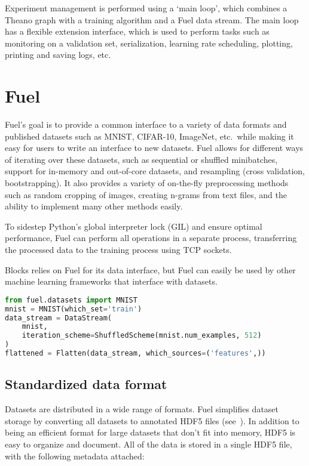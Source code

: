 \documentclass[twoside,11pt]{article}
\begin{document}
Experiment management is performed using a `main loop', which combines a Theano
graph with a training algorithm and a Fuel data stream. The main loop has a
flexible extension interface, which is used to perform tasks such as monitoring
on a validation set, serialization, learning rate scheduling, plotting, printing
and saving logs, etc.

\section{Fuel}

Fuel's goal is to provide a common interface to a variety of data formats and
published datasets such as MNIST, CIFAR-10, ImageNet, etc.\ while making it easy
for users to write an interface to new datasets. Fuel allows for different ways
of iterating over these datasets, such as sequential or shuffled minibatches,
support for in-memory and out-of-core datasets, and resampling (cross
validation, bootstrapping). It also provides a variety of on-the-fly
preprocessing methods such as random cropping of images, creating n-grams from
text files, and the ability to implement many other methods easily.

To sidestep Python's global interpreter lock (GIL) and ensure optimal
performance, Fuel can perform all operations in a separate process,
transferring the processed data to the training process using TCP sockets.

Blocks relies on Fuel for its data interface, but Fuel can easily be used by
other machine learning frameworks that interface with datasets.

\begin{lstlisting}[language=Python,basicstyle=\ttfamily,caption=Iterating over flattened MNIST features in shuffled batches]
from fuel.datasets import MNIST
mnist = MNIST(which_set='train')
data_stream = DataStream(
    mnist,
    iteration_scheme=ShuffledScheme(mnist.num_examples, 512)
)
flattened = Flatten(data_stream, which_sources=('features',))
\end{lstlisting}

\subsection{Standardized data format}

Datasets are distributed in a wide range of formats. Fuel simplifies dataset
storage by converting all datasets to annotated HDF5 
files (see~\cite{hdf5}). In addition to being
an efficient format for large datasets that don't fit into memory, HDF5 is easy
to organize and document. All of the data is stored in a single HDF5 file, with
the following metadata attached:
\end{document}

